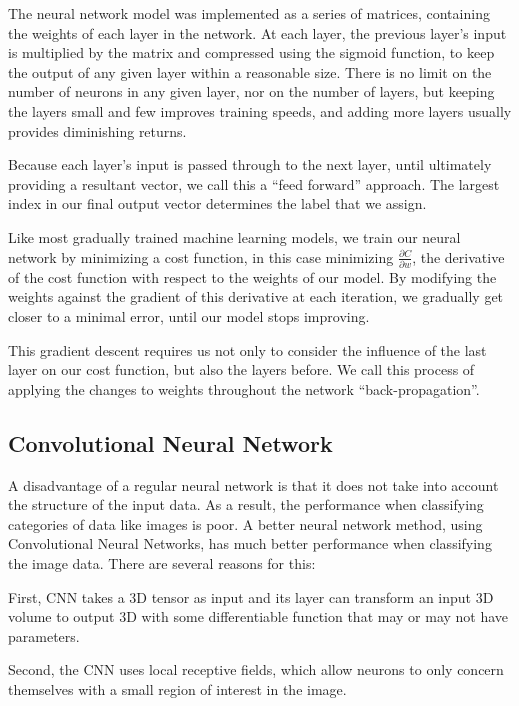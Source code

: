 \documentclass[conference]{IEEEtran}
\begin{document}
The neural network model was implemented as a series of matrices, containing the weights of each layer in the network. At each layer, the previous layer's input is multiplied by the matrix and compressed using the sigmoid function, to keep the output of any given layer within a reasonable size. There is no limit on the number of neurons in any given layer, nor on the number of layers, but keeping the layers small and few improves training speeds, and adding more layers usually provides diminishing returns.

Because each layer's input is passed through to the next layer, until ultimately providing a resultant vector, we call this a ``feed forward'' approach. The largest index in our final output vector determines the label that we assign.

Like most gradually trained machine learning models, we train our neural network by minimizing a cost function, in this case minimizing $\frac{\partial C}{\partial w}$, the derivative of the cost function with respect to the weights of our model. By modifying the weights against the gradient of this derivative at each iteration, we gradually get closer to a minimal error, until our model stops improving. 

This gradient descent requires us not only to consider the influence of the last layer on our cost function, but also the layers before. We call this process of applying the changes to weights throughout the network ``back-propagation''.

\subsection{Convolutional Neural Network}

A disadvantage of a regular neural network is that it does not take into account the structure of the input data. As a result, the performance when classifying categories of data like images is poor. 
A better neural network method, using Convolutional Neural Networks, has much better performance when classifying the image data. There are several reasons for this:

First, CNN takes a 3D tensor as input and its layer can transform an input 3D volume to output 3D with some differentiable function that may or may not have parameters. 

Second, the CNN uses local receptive fields, which allow neurons to only concern themselves with a small region of interest in the image. 
\end{document}

